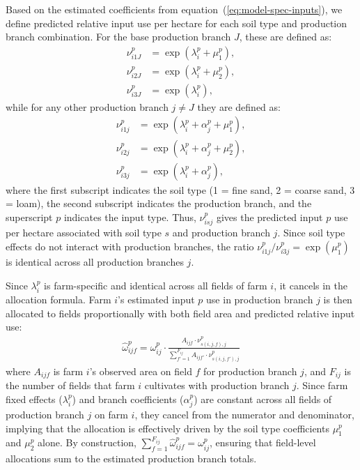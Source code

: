 \documentclass[12pt]{article}
\begin{document}
Based on the estimated coefficients from equation~(\ref{eq:model-spec-inputs}), we define predicted relative input use per hectare for each soil type and production branch combination. For the base production branch $J$, these are defined as:
\begin{align}
    \nu_{i1J}^p & = \exp\!\left(\lambda_i^p + \mu_1^p\right), \\
    \nu_{i2J}^p & = \exp\!\left(\lambda_i^p + \mu_2^p\right), \\
    \nu_{i3J}^p & = \exp\!\left(\lambda_i^p\right),
\end{align}
while for any other production branch $j \neq J$ they are defined as:
\begin{align}
    \nu_{i1j}^p & = \exp\!\left(\lambda_i^p + \alpha_j^p + \mu_1^p\right), \\
    \nu_{i2j}^p & = \exp\!\left(\lambda_i^p + \alpha_j^p + \mu_2^p\right), \\
    \nu_{i3j}^p & = \exp\!\left(\lambda_i^p + \alpha_j^p\right),
\end{align}
where the first subscript indicates the soil type (1 = fine sand, 2 = coarse sand, 3 = loam), the second subscript indicates the production branch, and the superscript $p$ indicates the input type. Thus, $\nu_{isj}^p$ gives the predicted input $p$ use per hectare associated with soil type $s$ and production branch $j$. Since soil type effects do not interact with production branches, the ratio $\nu_{i1j}^p/\nu_{i3j}^p = \exp(\mu_1^p)$ is identical across all production branches $j$.

Since $\lambda_i^p$ is farm-specific and identical across all fields of farm $i$, it cancels in the allocation formula. Farm $i$'s estimated input $p$ use in production branch $j$ is then allocated to fields proportionally with both field area and predicted relative input use:
\begin{align}
    \hat{\omega}_{ijf}^p = \omega_{ij}^p \cdot \frac{A_{ijf} \cdot \nu_{s(i,j,f),j}^p}
    {\sum_{f'=1}^{F_{ij}} A_{ijf'} \cdot \nu_{s(i,j,f'),j}^p}
\end{align}
where $A_{ijf}$ is farm $i$'s observed area on field $f$ for production branch $j$, and $F_{ij}$ is the number of fields that farm $i$ cultivates with production branch $j$. Since farm fixed effects ($\lambda_i^p$) and branch coefficients ($\alpha_j^p$) are constant across all fields of production branch $j$ on farm $i$, they cancel from the numerator and denominator, implying that the allocation is effectively driven by the soil type coefficients $\mu_1^p$ and $\mu_2^p$ alone. By construction, $\sum_{f=1}^{F_{ij}} \hat{\omega}_{ijf}^p = \omega_{ij}^p$, ensuring that field-level allocations sum to the estimated production branch totals.
\end{document}
